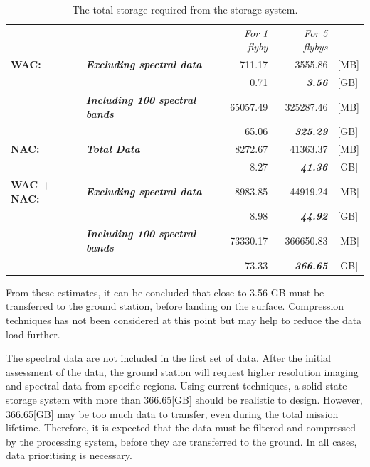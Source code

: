 \begin{table}[htb]
  \centering
\begin{tabular}{ll|r|r|l}
      &       & \textit{For 1 flyby} & \multicolumn{1}{r}{\textit{For 5 flybys}} &  \bigstrut[b]\\
\cline{1-4}\textbf{WAC:} & \multicolumn{1}{l|}{\textit{\textbf{Excluding spectral data}}} & 711.17 & 3555.86 & [MB] \bigstrut[t]\\
      & \multicolumn{1}{l|}{} & 0.71  & \textit{\textbf{3.56}} & [GB] \\
      & \multicolumn{1}{l|}{\textit{\textbf{Including 100 spectral bands}}} & 65057.49 & 325287.46 & [MB] \\
      & \multicolumn{1}{l|}{} & 65.06 & \textit{\textbf{325.29}} & [GB] \bigstrut[b]\\
\cline{1-4}\textbf{NAC:} & \multicolumn{1}{l|}{\textit{\textbf{Total Data}}} & 8272.67 & 41363.37 & [MB] \bigstrut[t]\\
      & \multicolumn{1}{l|}{} & 8.27  & \textit{\textbf{41.36}} & [GB] \bigstrut[b]\\
\hline
\textbf{WAC + NAC:} & \multicolumn{1}{l|}{\textit{\textbf{Excluding spectral data}}} & 8983.85 & 44919.24 & [MB] \bigstrut[t]\\
      & \multicolumn{1}{l|}{} & 8.98  & \textit{\textbf{44.92}} & [GB] \\
      & \multicolumn{1}{l|}{\textit{\textbf{Including 100 spectral bands}}} & 73330.17 & 366650.83 & [MB] \\
      & \multicolumn{1}{l|}{} & 73.33 & \textit{\textbf{366.65}} & [GB] \\
\end{tabular}%
\caption{The total storage required from the storage system.}
  \label{tab:data_rate_storage_requirements_final_5}%
\end{table}%

From these estimates, it can be concluded that close to 3.56 GB must be transferred to the ground station, before landing on the surface. Compression techniques has not been considered at this point but may help to reduce the data load further. 

The spectral data are not included in the first set of data. After the initial assessment of the data, the ground station will request higher resolution imaging and spectral data from specific regions. Using current techniques, a solid state storage system with more than 366.65[GB] should be realistic to design. However, 366.65[GB] may be too much data to transfer, even during the total mission lifetime. Therefore, it is expected that the data must be filtered and compressed by the processing system, before they are transferred to the ground. In all cases, data prioritising is necessary.
